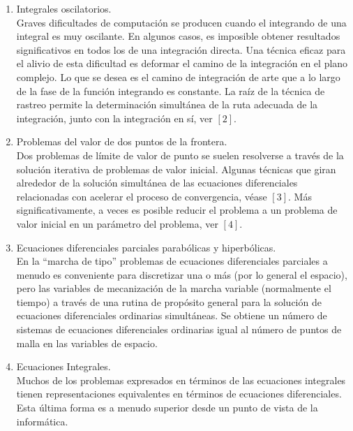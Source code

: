\begin{enumerate}
	\item Integrales oscilatorios.\\
		Graves dificultades de computación se producen cuando el integrando de una integral es muy oscilante.
		En algunos casos, es imposible obtener resultados significativos en todos los de una integración directa.
		Una técnica eficaz para el alivio de esta dificultad es deformar el camino de la integración en el plano
		complejo. Lo que se desea es el camino de integración de arte que a lo largo de la fase de la función
		integrando es constante. La raíz de la técnica de rastreo permite la determinación simultánea de la ruta
		adecuada de la integración, junto con la integración en sí, ver $[2]$.

	\item Problemas del valor de dos puntos de la frontera.\\
		Dos problemas de límite de valor de punto se suelen resolverse a través de la solución iterativa de
		problemas de valor inicial. Algunas técnicas que giran alrededor de la solución simultánea de las ecuaciones
		diferenciales relacionadas con acelerar el proceso de convergencia, véase $[3]$. Más significativamente,
		a veces es posible reducir el problema a un problema de valor inicial en un parámetro del problema, ver $[4]$.

	\item Ecuaciones diferenciales parciales parabólicas y hiperbólicas.\\
		En la ``marcha de tipo'' problemas de ecuaciones diferenciales parciales a menudo es conveniente para
		discretizar una o más (por lo general el espacio), pero las variables de mecanización de la marcha variable
		(normalmente el tiempo) a través de una rutina de propósito general para la solución de ecuaciones diferenciales
		ordinarias simultáneas. Se obtiene un número de sistemas de ecuaciones diferenciales ordinarias igual al número
		de puntos de malla en las variables de espacio.

	\item Ecuaciones Integrales.\\
		Muchos de los problemas expresados en términos de las ecuaciones integrales tienen representaciones equivalentes
		en términos de ecuaciones diferenciales. Esta última forma es a menudo superior desde un punto de vista de la
		informática.

\end{enumerate}
